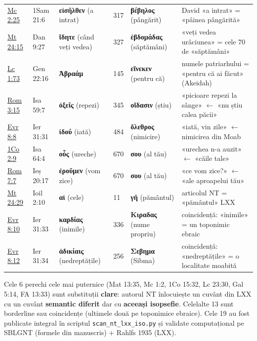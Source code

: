 \documentclass[12pt,a4paper,twoside,openany]{book}
\begin{document}
\begin{center}
\begin{tabularx}{\textwidth}{L{1.5cm}L{1.5cm}L{2.6cm}C{0.7cm}L{2.6cm}X}
\href{https://bibliaortodoxa.ro/carte.php?id=53\&cap=2\#25}{Mc 2:25} & 1Sam 21:6 & \textbf{εἰσῆλθεν} (a intrat) & 317 & \textbf{βέβηλος} (pângărit) & David «a intrat» = «pâinea pângărită» \\
\href{https://bibliaortodoxa.ro/carte.php?id=55\&cap=24\#15}{Mt 24:15} & Dan 9:27 & \textbf{ἴδητε} (când veți vedea) & 327 & \textbf{ἑβδομάδας} (săptămâni) & «veți vedea urâciunea» = cele 70 de «săptămâni» \\
\href{https://bibliaortodoxa.ro/carte.php?id=48\&cap=1\#73}{Lc 1:73} & Gen 22:16 & \textbf{Ἀβραάμ} & 145 & \textbf{εἵνεκεν} (pentru că) & numele patriarhului = «pentru că ai făcut» (Akeidah) \\
\href{https://bibliaortodoxa.ro/carte.php?id=70\&cap=3\#15}{Rom 3:15} & Isa 59:7 & \textbf{ὀξεῖς} (repezi) & 345 & \textbf{οἴδασιν} (știu) & «picioare repezi la sânge» $\leftarrow$ «nu știu calea păcii» \\
\href{https://bibliaortodoxa.ro/carte.php?id=65\&cap=8\#8}{Evr 8:8} & Ier 31:31 & \textbf{ἰδού} (iată) & 484 & \textbf{ὄλεθρος} (nimicire) & «iată, vin zile» $\leftarrow$ nimicirea din Moab \\
\href{https://bibliaortodoxa.ro/carte.php?id=54\&cap=2\#9}{1Co 2:9} & Isa 64:4 & \textbf{οὖς} (ureche) & 670 & \textbf{σου} (al tău) & «urechea n-a auzit» $\leftarrow$ «căile tale» \\
\href{https://bibliaortodoxa.ro/carte.php?id=70\&cap=7\#7}{Rom 7:7} & Ieș 20:17 & \textbf{ἐροῦμεν} (vom zice) & 670 & \textbf{σου} (al tău) & «ce vom zice?» $\leftarrow$ «ale aproapelui tău» \\
\href{https://bibliaortodoxa.ro/carte.php?id=55\&cap=24\#29}{Mt 24:29} & Ioil 2:10 & \textbf{αἱ} (cele) & 11 & \textbf{γῆ} (pământul) & articolul NT = «pământul» LXX \\
\href{https://bibliaortodoxa.ro/carte.php?id=65\&cap=8\#8}{Evr 8:10} & Ier 31:33 & \textbf{καρδίας} (inimile) & 336 & \textbf{Κιραδας} (nume propriu) & coincidență: «inimile» = un toponimic ebraic \\
\href{https://bibliaortodoxa.ro/carte.php?id=65\&cap=8\#12}{Evr 8:12} & Ier 31:34 & \textbf{ἀδικίαις} (nedreptățile) & 256 & \textbf{Σεβημα} (Sibma) & coincidență: «nedreptățile» = o localitate moabită \\
\bottomrule
\end{tabularx}
\end{center}

Cele 6 perechi cele mai puternice (Mat 13:35, Mc 1:2, 1Co 15:32, Lc 23:30, Gal 5:14, FA 13:33) sunt substituții \textbf{clare}: autorul NT înlocuiește un cuvânt din LXX cu un cuvânt \textbf{semantic diferit} dar cu \textbf{aceeași isopsefie}. Celelalte 13 sunt borderline sau coincidențe (ultimele două pe toponimice ebraice). Cele 19 au fost publicate integral în scriptul \texttt{scan\_nt\_lxx\_iso.py} și validate computațional pe SBLGNT (formele din manuscris) + Rahlfs 1935 (LXX).
\end{document}

